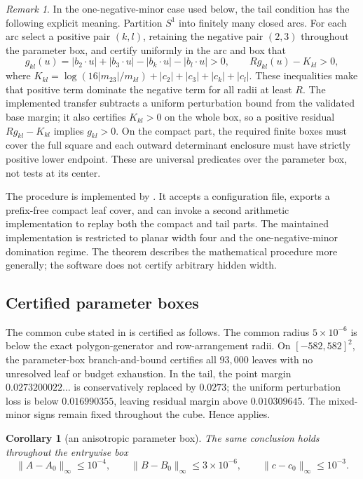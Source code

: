 \documentclass[11pt,twoside,leqno]{article}
\theoremstyle{plain}
\newtheorem{corollary}[corollary]{Corollary}
\theoremstyle{definition}
\theoremstyle{remark}
\newtheorem{remark}[remark]{Remark}
\newcommand{\norm}[1]{\lVert #1 \rVert}
\begin{document}
\begin{remark}
In the one-negative-minor case used below, the tail condition has the
following explicit meaning. Partition $S^1$ into finitely many closed arcs.
For each arc select a positive pair $(k,l)$, retaining the negative pair
$(2,3)$ throughout the parameter box, and certify uniformly in the arc and
box that
\[
 g_{kl}(u)=|b_2\cdot u|+|b_3\cdot u|-|b_k\cdot u|-|b_l\cdot u|>0,
 \qquad Rg_{kl}(u)-K_{kl}>0,
\]
where $K_{kl}=\log(16|m_{23}|/m_{kl})+|c_2|+|c_3|+|c_k|+|c_l|$.
These inequalities make that positive term dominate the negative term
for all radii at least $R$. The implemented transfer subtracts a uniform
perturbation bound from the validated base margin; it also certifies $K_{kl}>0$
on the whole box, so a positive residual $Rg_{kl}-K_{kl}$ implies $g_{kl}>0$.
On the compact part, the required finite boxes must cover the full square
and each outward determinant enclosure must have strictly positive lower
endpoint. These are universal predicates over the parameter box, not tests
at its center.

The procedure is implemented by .  It accepts a configuration file, exports a prefix-free compact leaf cover, and can invoke a second arithmetic implementation to replay both the compact and tail parts. The maintained implementation is restricted to planar width four and the one-negative-minor domination regime. The theorem describes the mathematical procedure more generally; the software does not certify arbitrary hidden width.
\end{remark}

\subsection{Certified parameter boxes}\label{app:quant-boxes}
The common cube stated in  is certified as follows.  The common radius $5\times10^{-6}$ is below the exact polygon-generator and row-arrangement radii.  On $[-582,582]^2$, the parameter-box branch-and-bound certifies all $93{,}000$ leaves with no unresolved leaf or budget exhaustion.  In the tail, the point margin $0.0273200022\ldots$ is conservatively replaced by $0.0273$; the uniform perturbation loss is below $0.016990355$, leaving residual margin above $0.010309645$.  The mixed-minor signs remain fixed throughout the cube.  Hence  applies.

\begin{corollary}[an anisotropic parameter box]\label{cor:anisotropic}
The same conclusion holds throughout the entrywise box
\[
 \norm{A-A_0}_\infty\le10^{-4},\qquad
 \norm{B-B_0}_\infty\le3\times10^{-6},\qquad
 \norm{c-c_0}_\infty\le10^{-3}.
\]
\end{corollary}
\end{document}
